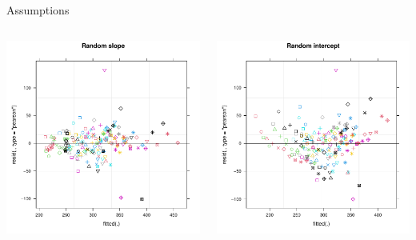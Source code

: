 \documentclass[aspectratio=169]{beamer}
\begin{document}
\begin{frame}{Assumptions}
  \begin{columns}
    \begin{column}{.5\textwidth}
      \includegraphics[scale=.5]{../figures/assump_resid_slope.pdf}
    \end{column}
    \begin{column}{.5\textwidth}
      \includegraphics[scale=.5]{../figures/assump_resid_intercept.pdf}
    \end{column}
  \end{columns}
\end{frame}
\end{document}

